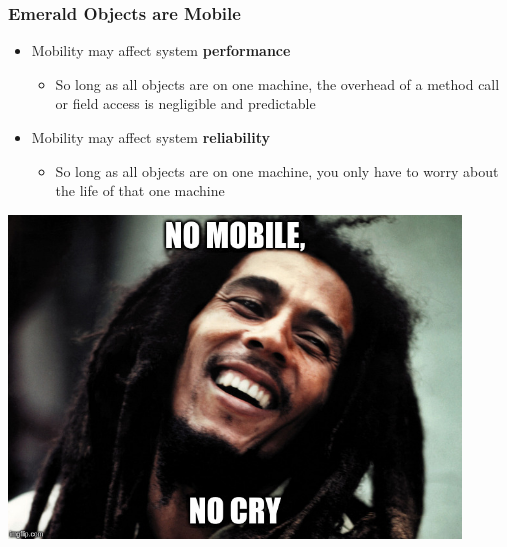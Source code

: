 \begin{frame}

\frametitle{Emerald Objects are Mobile}

\begin{itemize}

\item Mobility may affect system \textbf{performance}

\begin{itemize}

\item So long as all objects are on one machine, the overhead of a
method call or field access is negligible and predictable

\end{itemize}

\item Mobility may affect system \textbf{reliability}

\begin{itemize}

\item So long as all objects are on one machine, you only have to
worry about the life of that one machine

\end{itemize}

\end{itemize}

\end{frame}

\begin{frame}

\vspace{\fill}

\begin{center}

\includegraphics[width=0.9\textwidth]{figures/no-mobile-no-cry}

\end{center}

\vspace{\fill}

\end{frame}

